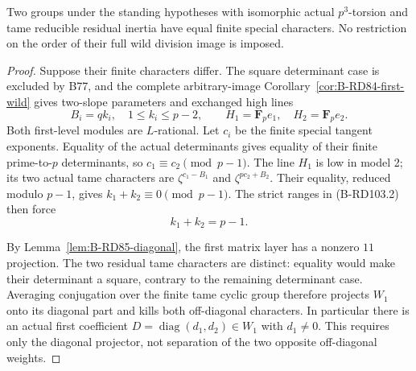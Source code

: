 \begin{theorem}
\label{thm:B-RD103-tame}
Two groups under the standing hypotheses with isomorphic
actual $p^3$-torsion and tame reducible residual inertia have
equal finite special characters. No restriction on the order
of their full wild division image is imposed.
\end{theorem}
\begin{proof}
Suppose their finite characters differ. The square determinant
case is excluded by B77, and the complete arbitrary-image
Corollary~\ref{cor:B-RD84-first-wild} gives two-slope parameters
and exchanged high lines
\[
 B_i=qk_i,\quad1\le k_i\le p-2,\qquad
 H_1=\mathbf F_pe_1,\quad H_2=\mathbf F_pe_2 .
                                                        \tag{B-RD103.2}
\]
Both first-level modules are $L$-rational.
Let $c_i$ be the finite special tangent exponents.
Equality of the actual determinants gives equality of their
finite prime-to-$p$ determinants, so
$c_1\equiv c_2\pmod{p-1}$.
The line $H_1$ is low in model 2; its two actual tame characters
are $\zeta^{c_1-B_1}$ and $\zeta^{pc_2+B_2}$.
Their equality, reduced modulo $p-1$, gives
$k_1+k_2\equiv0\pmod{p-1}$.
The strict ranges in (B-RD103.2) then force
\[
                 k_1+k_2=p-1.                         \tag{B-RD103.3}
\]

By Lemma~\ref{lem:B-RD85-diagonal}, the first matrix layer has
a nonzero $11$ projection. The two residual tame characters
are distinct: equality would make their determinant a square,
contrary to the remaining determinant case. Averaging
conjugation over the finite tame cyclic group therefore
projects $W_1$ onto its diagonal part and kills both
off-diagonal characters. In particular there is an actual
first coefficient $D=\operatorname{diag}(d_1,d_2)\in W_1$
with $d_1\ne0$. This requires only the diagonal projector,
not separation of the two opposite off-diagonal weights.


\end{proof}
